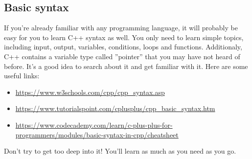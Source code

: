 \documentclass[12pt, a4paper]{article}
\begin{document}
\subsection{Basic syntax}
If you're already familiar with any programming language, it will probably be easy for you to learn C++ syntax as well. You only need to learn simple topics, including input, output, variables, conditions, loops and functions. Additionaly, C++ contains a variable type called ''pointer'' that you may have not heard of before. It's a good idea to search about it and get familiar with it. Here are some useful links:
\begin{itemize}
\item \url{https://www.w3schools.com/cpp/cpp_syntax.asp}
\item \url{https://www.tutorialspoint.com/cplusplus/cpp_basic_syntax.htm}
\item \url{https://www.codecademy.com/learn/c-plus-plus-for-programmers/modules/basic-syntax-in-cpp/cheatsheet}
\end{itemize}
Don't try to get too deep into it! You'll learn as much as you need as you go.
\end{document}
